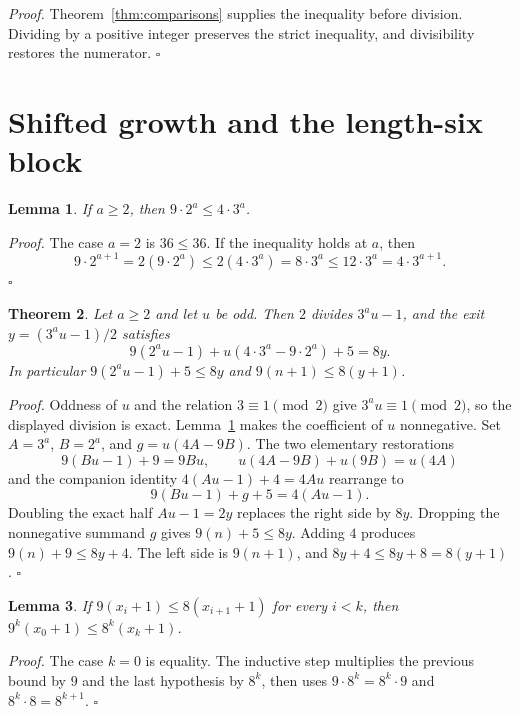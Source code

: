 \documentclass[11pt,letterpaper]{article}
\newtheorem{theorem}{Theorem}
\newtheorem{lemma}[theorem]{Lemma}
\newenvironment{proof}{\noindent\textit{Proof.}}{\hfill\(\square\)}
\begin{document}
\begin{proof}
Theorem~\ref{thm:comparisons} supplies the inequality before division. Dividing by a positive integer preserves the strict inequality, and divisibility restores the numerator.
\end{proof}

\section{Shifted growth and the length-six block}

\begin{lemma}
\label{lem:gap}
If \(a\ge 2\), then \(9\cdot 2^a\le 4\cdot 3^a\).
\end{lemma}

\begin{proof}
The case \(a=2\) is \(36\le 36\). If the inequality holds at \(a\), then
\[
9\cdot 2^{a+1}=2(9\cdot 2^a)\le 2(4\cdot 3^a)=8\cdot 3^a\le 12\cdot 3^a=4\cdot 3^{a+1}.
\]
\end{proof}

\begin{theorem}
\label{thm:slack}
Let \(a\ge 2\) and let \(u\) be odd. Then \(2\) divides \(3^a u-1\), and the exit \(y=(3^a u-1)/2\) satisfies
\[
9(2^a u-1)+u(4\cdot 3^a-9\cdot 2^a)+5=8y.
\]
In particular \(9(2^a u-1)+5\le 8y\) and \(9(n+1)\le 8(y+1)\).
\end{theorem}

\begin{proof}
Oddness of \(u\) and the relation \(3\equiv 1\pmod{2}\) give \(3^a u\equiv 1\pmod{2}\), so the displayed division is exact. Lemma~\ref{lem:gap} makes the coefficient of \(u\) nonnegative. Set \(A=3^a\), \(B=2^a\), and \(g=u(4A-9B)\). The two elementary restorations
\[
9(Bu-1)+9=9Bu,\qquad u(4A-9B)+u(9B)=u(4A)
\]
and the companion identity \(4(Au-1)+4=4Au\) rearrange to
\[
9(Bu-1)+g+5=4(Au-1).
\]
Doubling the exact half \(Au-1=2y\) replaces the right side by \(8y\). Dropping the nonnegative summand \(g\) gives \(9(n)+5\le 8y\). Adding \(4\) produces \(9(n)+9\le 8y+4\). The left side is \(9(n+1)\), and \(8y+4\le 8y+8=8(y+1)\).
\end{proof}

\begin{lemma}
\label{lem:chain}
If \(9(x_i+1)\le 8(x_{i+1}+1)\) for every \(i<k\), then \(9^k(x_0+1)\le 8^k(x_k+1)\).
\end{lemma}

\begin{proof}
The case \(k=0\) is equality. The inductive step multiplies the previous bound by \(9\) and the last hypothesis by \(8^k\), then uses \(9\cdot 8^k=8^k\cdot 9\) and \(8^k\cdot 8=8^{k+1}\).
\end{proof}
\end{document}
